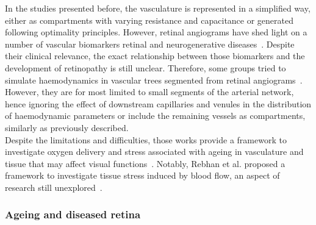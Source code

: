 \documentclass[12pt,a4paper]{article}
\begin{document}
In the studies presented before, the vasculature is represented in a simplified way, either as compartments with varying resistance and capacitance or generated following optimality principles.
However, retinal angiograms have shed light on a number of vascular biomarkers retinal and neurogenerative diseases~\cite{Chalam_2016,Tsokolas_2020}.
Despite their clinical relevance, the exact relationship between those biomarkers and the development of retinopathy is still unclear.
Therefore, some groups tried to simulate haemodynamics in vascular trees segmented from retinal angiograms~\cite{Aletti_2016, Malek_2015, Liu_2009, Rebhan_2019}.
However, they are for most limited to small segments of the arterial network, hence ignoring the effect of downstream capillaries and venules in the distribution of haemodynamic parameters or include the remaining vessels as compartments, similarly as previously described.\\
Despite the limitations and difficulties, those works provide a framework to investigate oxygen delivery and stress associated with ageing in vasculature and tissue that may affect visual functions~\cite{Rickett_2010,Sim_2013,Wessel_2012}.
Notably, Rebhan et al. proposed a framework to investigate tissue stress induced by blood flow, an aspect of research still unexplored~\cite{Rebhan_2019}.

\break

\subsubsection{Ageing and diseased retina}
\end{document}
